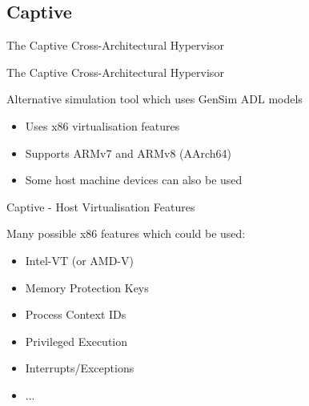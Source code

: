 \subsection{Captive}

\begin{frame}{The Captive Cross-Architectural Hypervisor}

\end{frame}

\begin{frame}{The Captive Cross-Architectural Hypervisor}

Alternative simulation tool which uses GenSim ADL models

\begin{itemize}
	\item Uses x86 virtualisation features
	\item Supports ARMv7 and ARMv8 (AArch64)
	\item Some host machine devices can also be used
\end{itemize}

\end{frame}

\begin{frame}{Captive - Host Virtualisation Features}

Many possible x86 features which could be used:

\begin{itemize}
	\item Intel-VT (or AMD-V)
	\item Memory Protection Keys
	\item Process Context IDs
	\item Privileged Execution
	\item Interrupts/Exceptions
	\item ...
\end{itemize}

\end{frame}
